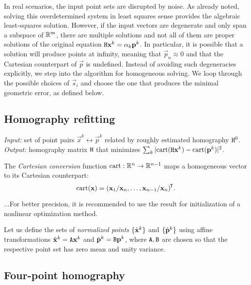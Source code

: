 In real scenarios, the input point sets are disrupted by noise.
As already noted, solving this overdetermined system in least squares sense provides the algebraic least-squares solution.
However, if the input vectors are degenerate and only span a subspace of $\mathbb{R}^m$, there are multiple solutions and not all of them are proper solutions of the original equation $\mathtt{H} \mathbf{x}^k = \alpha_k \mathbf{p}^k$.
In particular, it is possible that a solution will produce points at infinity, meaning that $\vec p_n \approx 0$ and that the Cartesian counterpart of $\vec p$ is undefined.
Instead of avoiding such degeneracies explicitly, we step into the algorithm for homogeneous solving.
We loop through the possible choices of $\vec s_i$ and choose the one that produces the minimal geometric error, as defined below.

\subsection{Homography refitting} 

\textit{Input:} set of point pairs $\vec x^k \leftrightarrow \vec p^k$ related by roughly estimated homography $\mathtt{H}^0$.\\
\textit{Output:} homography matrix $\mathtt{H}$ that minimizes $\sum_k |\mathrm{cart}(\mathtt{H} \mathbf{x}^k) - \mathrm{cart}(\mathbf{p}^k)|^2$.\\

\begin{definition}
The \textit{Cartesian conversion} function $\mathrm{cart}: \mathbb{R}^n \to \mathbb{R}^{n - 1}$ maps a homogeneous vector to its Cartesian counterpart:
$$
\mathrm{cart}(\mathbf{x}) = (\mathbf{x}_1 / \mathbf{x}_n, \dots, \mathbf{x}_{n - 1} / \mathbf{x}_n)^{\!\mathsf{T}}.
$$
\end{definition}

...For better precision, it is recommended to use the result for initialization of a nonlinear optimization method.

Let us define the sets of \textit{normalized points} $\{ \hat{\mathbf{x}}^k \}$ and $\{ \hat{\mathbf{p}}^k \}$ using affine transformations $\hat{\mathbf{x}}^k = \mathtt{A} \mathbf{x}^k$ and $\hat{\mathbf{p}}^k = \mathtt{B} \mathbf{p}^k$, where $\mathtt{A}, \mathtt{B}$ are chosen so that the respective point set has zero mean and unity variance.


\subsection{Four-point homography}

